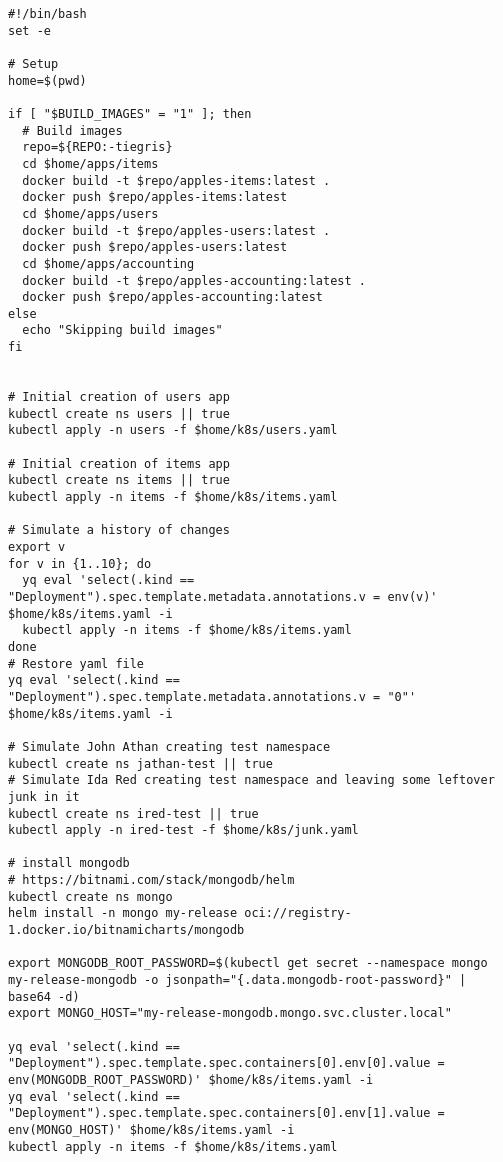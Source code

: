 \begin{lstlisting}[caption={initial-setup.sh},language=mybash,label=appendix:csr:setup]
#!/bin/bash
set -e

# Setup
home=$(pwd)

if [ "$BUILD_IMAGES" = "1" ]; then
  # Build images
  repo=${REPO:-tiegris}
  cd $home/apps/items
  docker build -t $repo/apples-items:latest .
  docker push $repo/apples-items:latest
  cd $home/apps/users
  docker build -t $repo/apples-users:latest .
  docker push $repo/apples-users:latest
  cd $home/apps/accounting
  docker build -t $repo/apples-accounting:latest .
  docker push $repo/apples-accounting:latest
else
  echo "Skipping build images"
fi


# Initial creation of users app
kubectl create ns users || true
kubectl apply -n users -f $home/k8s/users.yaml

# Initial creation of items app
kubectl create ns items || true
kubectl apply -n items -f $home/k8s/items.yaml

# Simulate a history of changes
export v
for v in {1..10}; do
  yq eval 'select(.kind == "Deployment").spec.template.metadata.annotations.v = env(v)' $home/k8s/items.yaml -i
  kubectl apply -n items -f $home/k8s/items.yaml
done
# Restore yaml file
yq eval 'select(.kind == "Deployment").spec.template.metadata.annotations.v = "0"' $home/k8s/items.yaml -i

# Simulate John Athan creating test namespace
kubectl create ns jathan-test || true
# Simulate Ida Red creating test namespace and leaving some leftover junk in it
kubectl create ns ired-test || true
kubectl apply -n ired-test -f $home/k8s/junk.yaml

# install mongodb
# https://bitnami.com/stack/mongodb/helm
kubectl create ns mongo
helm install -n mongo my-release oci://registry-1.docker.io/bitnamicharts/mongodb

export MONGODB_ROOT_PASSWORD=$(kubectl get secret --namespace mongo my-release-mongodb -o jsonpath="{.data.mongodb-root-password}" | base64 -d)
export MONGO_HOST="my-release-mongodb.mongo.svc.cluster.local"

yq eval 'select(.kind == "Deployment").spec.template.spec.containers[0].env[0].value = env(MONGODB_ROOT_PASSWORD)' $home/k8s/items.yaml -i
yq eval 'select(.kind == "Deployment").spec.template.spec.containers[0].env[1].value = env(MONGO_HOST)' $home/k8s/items.yaml -i
kubectl apply -n items -f $home/k8s/items.yaml
\end{lstlisting}

